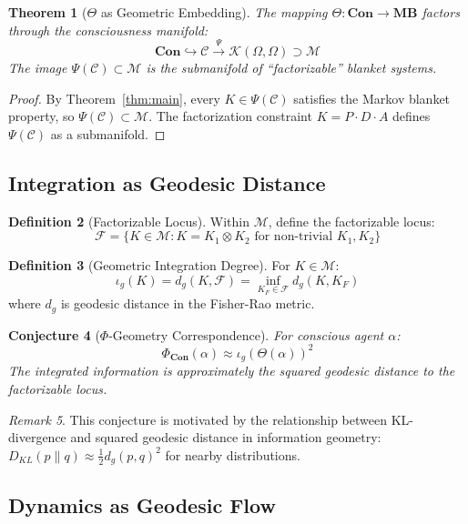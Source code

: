\documentclass[11pt,a4paper]{article}
\theoremstyle{definition}
\newtheorem{definition}{Definition}[section]
\theoremstyle{plain}
\newtheorem{theorem}[definition]{Theorem}
\newtheorem{conjecture}[definition]{Conjecture}
\theoremstyle{remark}
\newtheorem{remark}[definition]{Remark}
\newcommand{\Con}{\mathbf{Con}}
\newcommand{\MB}{\mathbf{MB}}
\begin{document}
\begin{theorem}[$\Theta$ as Geometric Embedding]\label{thm:theta-embedding}
The mapping $\Theta: \Con \to \MB$ factors through the consciousness manifold:
\[
\Con \hookrightarrow \mathcal{C} \xrightarrow{\Psi} \mathcal{K}(\Omega, \Omega) \supset \mathcal{M}
\]
The image $\Psi(\mathcal{C}) \subset \mathcal{M}$ is the submanifold of ``factorizable'' blanket systems.
\end{theorem}

\begin{proof}
By Theorem~\ref{thm:main}, every $K \in \Psi(\mathcal{C})$ satisfies the Markov blanket property, so $\Psi(\mathcal{C}) \subset \mathcal{M}$. The factorization constraint $K = P \cdot D \cdot A$ defines $\Psi(\mathcal{C})$ as a submanifold.
\end{proof}

\subsection{Integration as Geodesic Distance}

\begin{definition}[Factorizable Locus]
Within $\mathcal{M}$, define the factorizable locus:
\[
\mathcal{F} = \{ K \in \mathcal{M} : K = K_1 \otimes K_2 \text{ for non-trivial } K_1, K_2 \}
\]
\end{definition}

\begin{definition}[Geometric Integration Degree]
For $K \in \mathcal{M}$:
\[
\iota_g(K) = d_g(K, \mathcal{F}) = \inf_{K_F \in \mathcal{F}} d_g(K, K_F)
\]
where $d_g$ is geodesic distance in the Fisher-Rao metric.
\end{definition}

\begin{conjecture}[$\Phi$-Geometry Correspondence]\label{conj:phi-geometry}
For conscious agent $\alpha$:
\[
\Phi_{\Con}(\alpha) \approx \iota_g(\Theta(\alpha))^2
\]
The integrated information is approximately the squared geodesic distance to the factorizable locus.
\end{conjecture}

\begin{remark}
This conjecture is motivated by the relationship between KL-divergence and squared geodesic distance in information geometry: $D_{KL}(p \| q) \approx \frac{1}{2} d_g(p, q)^2$ for nearby distributions.
\end{remark}

\subsection{Dynamics as Geodesic Flow}
\end{document}
